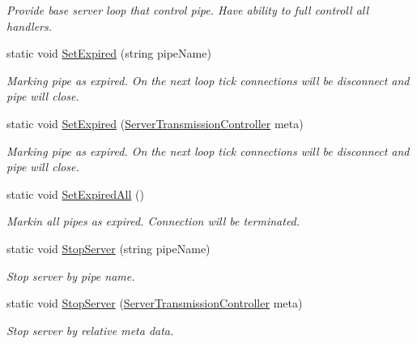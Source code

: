 \begin{DoxyCompactItemize}
\begin{DoxyCompactList}\small\item\em Provide base server loop that control pipe. Have ability to full controll all handlers. \end{DoxyCompactList}\item 
static void \mbox{\hyperlink{class_pipes_provider_1_1_server_1_1_server_a_p_i_a750e3c4f0e34e61724ab3914d0d0608e}{Set\+Expired}} (string pipe\+Name)
\begin{DoxyCompactList}\small\item\em Marking pipe as expired. On the next loop tick connections will be disconnect and pipe will close. \end{DoxyCompactList}\item 
static void \mbox{\hyperlink{class_pipes_provider_1_1_server_1_1_server_a_p_i_a6f3fd6e9d69f4bb96ba5f3c3738cf439}{Set\+Expired}} (\mbox{\hyperlink{class_pipes_provider_1_1_server_1_1_server_transmission_controller}{Server\+Transmission\+Controller}} meta)
\begin{DoxyCompactList}\small\item\em Marking pipe as expired. On the next loop tick connections will be disconnect and pipe will close. \end{DoxyCompactList}\item 
static void \mbox{\hyperlink{class_pipes_provider_1_1_server_1_1_server_a_p_i_a6d6f42c39e7f5c8a63a026739fe0ea94}{Set\+Expired\+All}} ()
\begin{DoxyCompactList}\small\item\em Markin all pipes as expired. Connection will be terminated. \end{DoxyCompactList}\item 
static void \mbox{\hyperlink{class_pipes_provider_1_1_server_1_1_server_a_p_i_af9c612e584b125b1fdc2c32490613bb1}{Stop\+Server}} (string pipe\+Name)
\begin{DoxyCompactList}\small\item\em Stop server by pipe name. \end{DoxyCompactList}\item 
static void \mbox{\hyperlink{class_pipes_provider_1_1_server_1_1_server_a_p_i_a609a8bfa71dc08c179fc3785ec24a4bd}{Stop\+Server}} (\mbox{\hyperlink{class_pipes_provider_1_1_server_1_1_server_transmission_controller}{Server\+Transmission\+Controller}} meta)
\begin{DoxyCompactList}\small\item\em Stop server by relative meta data. \end{DoxyCompactList}\item 

\end{DoxyCompactItemize}
